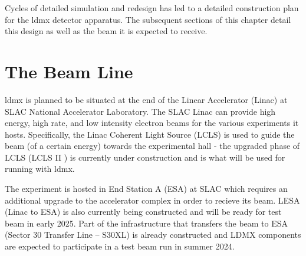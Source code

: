 
Cycles of detailed simulation and redesign has led to a detailed construction plan for the \ac{ldmx}
detector apparatus. The subsequent sections of this chapter detail this design as well as
the beam it is expected to receive.

\section{The Beam Line}
\ac{ldmx} is planned to be situated at the end of the Linear Accelerator (Linac) at SLAC National Accelerator
Laboratory. The SLAC Linac can provide high energy, high rate, and low intensity electron beams for
the various experiments it hosts. Specifically, the Linac Coherent Light Source (LCLS) is
used to guide the beam (of a certain energy) towards the experimental hall - the upgraded
phase of LCLS (LCLS II \cite{lcls-ii}) is currently under construction and is what will
be used for running with \ac{ldmx}.

The experiment is hosted in End Station A (ESA) at SLAC which requires an additional upgrade to the
accelerator complex in order to recieve its beam. LESA (Linac to ESA) \cite{lesa-design} is also currently being
constructed and will be ready for test beam in early 2025. Part of the infrastructure that
transfers the beam to ESA (Sector 30 Transfer Line -- S30XL) is already constructed and LDMX
components are expected to participate in a test beam run in summer 2024.

